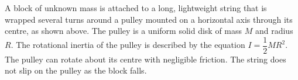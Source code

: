 \documentclass{../../oss-apphys-exam}
\begin{document}
\begin{questions}
%    
%    
%
%
%      

  \question A block of unknown mass is attached to a long, lightweight string
  that is wrapped several turns around a pulley mounted on a horizontal axis
  through its centre, as shown above. The pulley is a uniform solid disk of
  mass $M$ and radius $R$. The rotational inertia of the pulley is described by
  the equation $I=\dfrac12MR^2$. The pulley can rotate about its centre with
  negligible friction. The string does not slip on the pulley as the block
  falls.


\end{questions}
\end{document}
